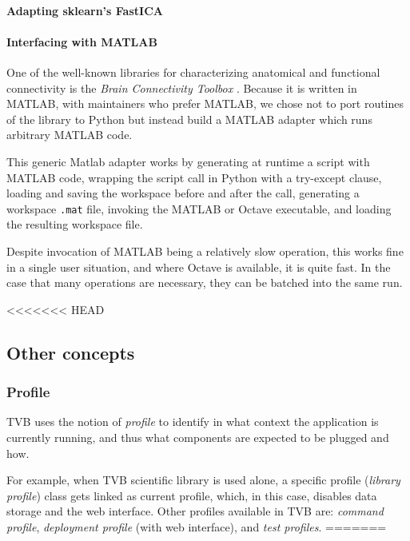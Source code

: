 \paragraph{Adapting sklearn's FastICA}




\paragraph{Interfacing with MATLAB}

One of the well-known libraries for characterizing anatomical 
and functional connectivity is the \emph{Brain Connectivity Toolbox} 
\cite{Rubinov_2010}. 
Because it is written in MATLAB, with maintainers who prefer MATLAB, we 
chose not to port routines of the library to Python but instead build
a MATLAB adapter which runs arbitrary MATLAB code. 

This generic Matlab adapter works by generating at runtime a script with MATLAB code, 
wrapping the script call in Python with a try-except clause,  
loading and saving the workspace before and after the call,
generating a workspace \texttt{.mat} file, invoking the MATLAB or Octave
executable, and loading the resulting workspace file. 

Despite invocation of MATLAB being a relatively slow operation, this works fine in a single
user situation, and where Octave is available, it is quite fast. In the 
case that many operations are necessary, they can be batched into the 
same run.

<<<<<<< HEAD
\subsection{Other concepts}

	\subsubsection{Profile}

TVB uses the notion of \emph{profile} to identify in what context the application is currently running,
and thus what components are expected to be plugged and how.

For example, when TVB scientific library is used alone, a specific profile (\emph{library profile}) class 
gets linked as current profile, which, in this case, disables data storage and the web interface. Other profiles available
in TVB are: \emph{command profile}, \emph{deployment profile} (with web interface), and \emph{test profiles}.
=======
